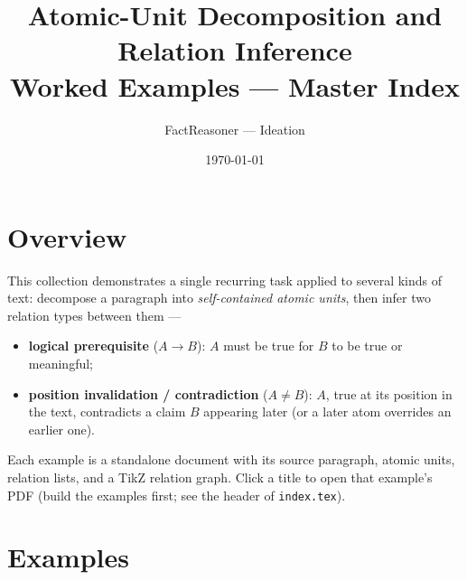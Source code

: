 \documentclass[11pt]{article}
\title{Atomic-Unit Decomposition and Relation Inference\\\large Worked Examples --- Master Index}
\author{FactReasoner --- Ideation}
\date{\today}
\begin{document}
\maketitle

\section*{Overview}

This collection demonstrates a single recurring task applied to several kinds of
text: decompose a paragraph into \emph{self-contained atomic units}, then infer
two relation types between them ---

\begin{itemize}[leftmargin=*,nosep]
  \item \textbf{logical prerequisite} ($A \rightarrow B$): $A$ must be true for
        $B$ to be true or meaningful;
  \item \textbf{position invalidation / contradiction} ($A \neq B$): $A$, true at
        its position in the text, contradicts a claim $B$ appearing later (or a
        later atom overrides an earlier one).
\end{itemize}

Each example is a standalone document with its source paragraph, atomic units,
relation lists, and a TikZ relation graph. Click a title to open that example's
PDF (build the examples first; see the header of \nolinkurl{index.tex}).

\section*{Examples}
\end{document}
